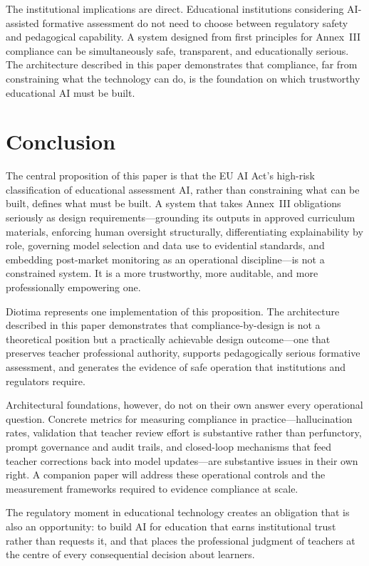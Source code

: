 \documentclass[10pt, a4paper, twocolumn]{article}
\begin{document}
The institutional implications are direct. Educational institutions considering
AI-assisted formative assessment do not need to choose between regulatory safety and
pedagogical capability. A system designed from first principles for Annex~III compliance
can be simultaneously safe, transparent, and educationally serious. The architecture
described in this paper demonstrates that compliance, far from constraining what the
technology can do, is the foundation on which trustworthy educational AI must be built.

\section{Conclusion}

The central proposition of this paper is that the EU AI Act's high-risk classification
of educational assessment AI, rather than constraining what can be built, defines what
must be built. A system that takes Annex~III obligations seriously as design
requirements---grounding its outputs in approved curriculum materials, enforcing human
oversight structurally, differentiating explainability by role, governing model
selection and data use to evidential standards, and embedding post-market monitoring as
an operational discipline---is not a constrained system. It is a more trustworthy, more
auditable, and more professionally empowering one.

Diotima represents one implementation of this proposition. The architecture described
in this paper demonstrates that compliance-by-design is not a theoretical position but
a practically achievable design outcome---one that preserves teacher professional
authority, supports pedagogically serious formative assessment, and generates the
evidence of safe operation that institutions and regulators require.

Architectural foundations, however, do not on their own answer every operational
question. Concrete metrics for measuring compliance in practice---hallucination rates,
validation that teacher review effort is substantive rather than perfunctory, prompt
governance and audit trails, and closed-loop mechanisms that feed teacher corrections
back into model updates---are substantive issues in their own right. A companion paper
will address these operational controls and the measurement frameworks required to
evidence compliance at scale.

The regulatory moment in educational technology creates an obligation that is also an
opportunity: to build AI for education that earns institutional trust rather than
requests it, and that places the professional judgment of teachers at the centre of
every consequential decision about learners.
\end{document}
